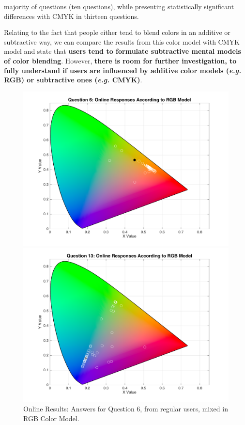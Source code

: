 majority of questions (ten questions), while presenting statistically significant differences with CMYK in thirteen questions. \par
%
Relating to the fact that people either tend to blend colors in an additive or subtractive way, we can compare the results from this color model with CMYK model and state that \textbf{users tend to formulate subtractive mental models of color
blending}. However, \textbf{there is room for further investigation, to fully understand if users are influenced by additive color models (\emph{e.g.} RGB) or subtractive ones (\emph{e.g.} CMYK)}. \par
%
\begin{figure}[!htbp]
  \centering
  \begin{minipage}{0.48\textwidth}
    \centering
    \includegraphics[width=\textwidth]{images/6_online_RGBresponses.png}
    \caption[Online Results: Answers for Question 6, from regular users, mixed in RGB Color Model.]{Online Results: Answers for Question 6, from regular users, mixed in RGB Color Model.}
    \label{fig:onlinergbregular_6}
  \end{minipage}\hfill
  \begin{minipage}{0.48\textwidth}
    \centering
    \includegraphics[width=\textwidth]{images/13_online_RGBresponses.png}

\end{minipage}
\end{figure}
